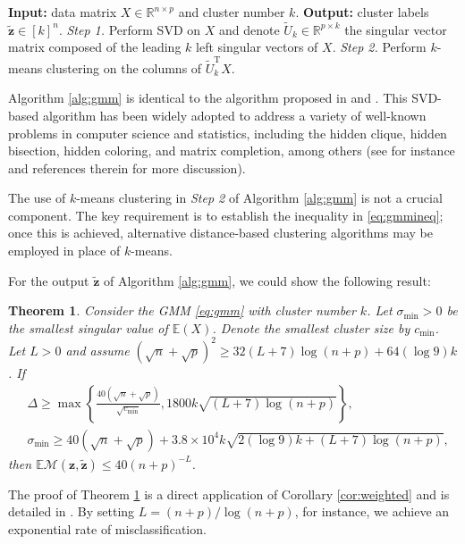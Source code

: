 \documentclass[reqno]{amsart}
\newcommand{\E}{\mathbb{E}}
\newcommand{\T}{\mathrm{T}}
\theoremstyle{plain}
\newtheorem{theorem}{Theorem}
\theoremstyle{definition}
\begin{document}
\begin{algorithm}
    \caption{Spectral algorithm for GMM}
    \label{alg:gmm}
    \begin{algorithmic}
   \State \textbf{Input:} data matrix $X \in \mathbb R^{n\times p}$ and cluster number $k$.
     \State \textbf{Output:} cluster labels $\widetilde{\mathbf z} \in [k]^n$.
    \State  \emph{Step 1.} Perform SVD on $X$ and denote $\widetilde U_k \in \mathbb R^{p\times k}$ the singular vector matrix composed of the leading $k$ left singular vectors of $X$.
    \State \emph{Step 2.} Perform $k$-means clustering on the columns of $\widetilde U_k^\T X$.
    \end{algorithmic}
\end{algorithm}
 Algorithm \ref{alg:gmm} is identical to the algorithm proposed in \cite{LZZ21} and \cite{ZZ22}. This SVD-based algorithm has been widely adopted to address a variety of well-known problems in computer science and statistics, including the hidden clique, hidden bisection, hidden coloring, and matrix completion, among others (see for instance \cite{Vu18,LZZ21} and references therein for more discussion). 

The use of $k$-means clustering in \emph{Step 2} of Algorithm \ref{alg:gmm} is not a crucial component. The key requirement is to establish the inequality in \eqref{eq:gmmineq}; once this is achieved, alternative distance-based clustering algorithms may be employed in place of $k$-means.

For the output $\widetilde{\mathbf z}$ of Algorithm \ref{alg:gmm}, we could show the following result:
\begin{theorem}\label{thm:gmm} Consider the GMM \eqref{eq:gmm} with cluster number $k$. Let $\sigma_{\min}>0$ be the smallest singular value of $\E(X)$. Denote the smallest cluster size by $c_{\min}$.  Let $L>0$ and assume $(\sqrt n + \sqrt p)^2 \ge 32(L+7) \log(n+p) + 64(\log 9) k$.
If 
\begin{align}\label{eq:Deltabd}
&\Delta \ge \max\left\{ \frac{40(\sqrt n + \sqrt p)}{\sqrt{c_{\min}}}, 1800k\sqrt{(L+7)\log(n+p)}  \right\},\\
&\sigma_{\min} \ge 40(\sqrt n + \sqrt p)+ 3.8\times 10^4  k \sqrt{2(\log 9)  k + (L+7)\log(n+p)}\nonumber,
\end{align}
then $\E \mathcal M (\mathbf z, \widetilde{\mathbf z}) \le 40(n+p)^{-L}$.
\end{theorem}
The proof of Theorem \ref{thm:gmm} is a direct application of Corollary \ref{cor:weighted} and is detailed in \cite{WangSupp24}. By setting $L=(n+p)/\log(n+p)$, for instance, we achieve an exponential rate of misclassification. 
\end{document}
